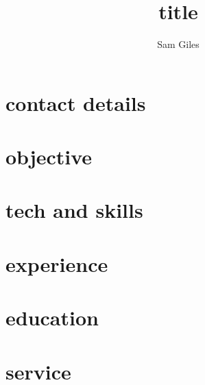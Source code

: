 \documentclass{article}
\begin{document}
\title{title}
\author{Sam Giles}

\maketitle

\section{contact details}
\section{objective}
\section{tech and skills}
\section{experience}
\section{education}
\section{service}
\end{document}
